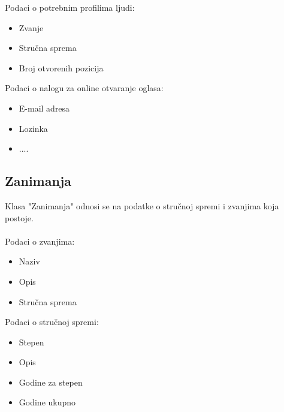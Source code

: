 \noindent Podaci o potrebnim profilima ljudi:
\begin{itemize}
	\item Zvanje
	\item Stru\v cna sprema
	\item Broj otvorenih pozicija
\end{itemize}

\noindent Podaci o nalogu za online otvaranje oglasa:
\begin{itemize}
	\item E-mail adresa
	\item Lozinka
	\item ....
\end{itemize}


\subsection{Zanimanja}
Klasa "Zanimanja" odnosi se na podatke o stru\v cnoj spremi i zvanjima koja postoje.
\\
\\ Podaci o zvanjima:
\begin{itemize}
	\item Naziv
	\item Opis
	\item Stru\v cna sprema
\end{itemize}

\noindent Podaci o stru\v cnoj spremi:
\begin{itemize}
	\item Stepen
	\item Opis
	\item Godine za stepen
	\item Godine ukupno
\end{itemize}
